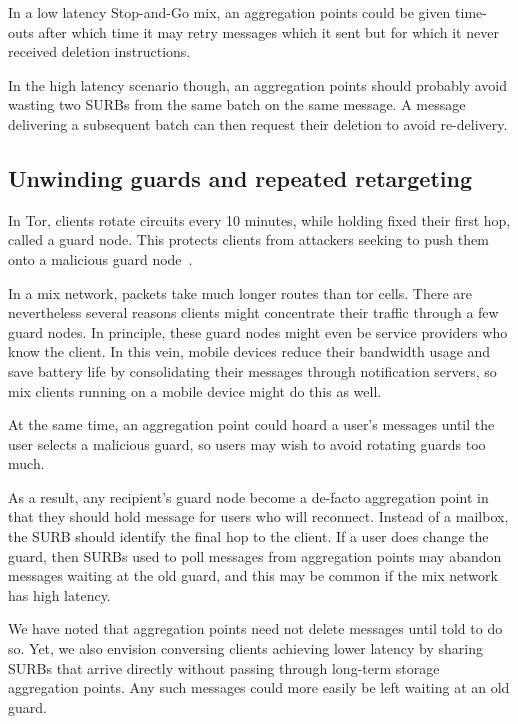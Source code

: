 In a low latency Stop-and-Go mix, an aggregation points could be
given time-outs after which time it may retry messages which it sent
but for which it never received deletion instructions.

In the high latency scenario though, an aggregation points should
probably  avoid wasting two SURBs from the same batch on the same
message.  A message delivering a subsequent batch can then request
their deletion to avoid re-delivery.


\subsection{Unwinding guards and repeated retargeting}

In Tor, clients rotate circuits every 10 minutes, while holding
fixed their first hop, called a guard node.  This protects clients
from attackers seeking to push them onto a malicious guard
node~\cite{tor-guards}.

In a mix network, packets take much longer routes than tor cells.
There are nevertheless several reasons clients might concentrate
their traffic through a few guard nodes.  In principle, these
guard nodes might even be service providers who know the client. 
In this vein, mobile devices reduce their bandwidth usage and save
battery life by consolidating their messages through notification
servers, so mix clients running on a mobile device might do this as well.

At the same time, an aggregation point could hoard a user's messages
until the user selects a malicious guard, so users may wish to avoid
rotating guards too much.  

As a result, any recipient's guard node become a de-facto aggregation
point in that they should hold message for users who will reconnect.
Instead of a mailbox, the SURB should identify the final hop to the
client.  If a user does change the guard, then SURBs used to poll
messages from aggregation points may abandon messages waiting at the
old guard, and this may be common if the mix network has high latency.

We have noted that aggregation points need not delete messages until
told to do so.  Yet, we also envision conversing clients achieving
lower latency by sharing SURBs that arrive directly without passing
through long-term storage aggregation points.  Any such messages
could more easily be left waiting at an old guard.

